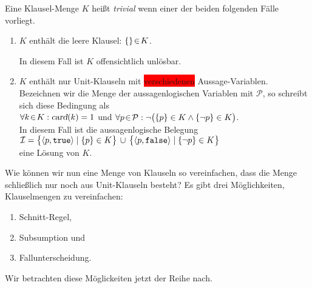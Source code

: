 \begin{Definition}
  Eine Klausel-Menge $K$ hei\ss{}t \emph{\color{blue}trivial} wenn einer der beiden folgenden F\"{a}lle
  vorliegt.
  \begin{enumerate}
  \item $K$ enth\"{a}lt die leere Klausel: \qquad $\{\} \!\in\! K$.

        In diesem Fall ist $K$ offensichtlich unl\"{o}sbar.
  \item $K$ enth\"{a}lt nur Unit-Klauseln mit \colorbox{red}{verschiedenen} Aussage-Variablen.
        Bezeichnen wir die Menge der aussagenlogischen Variablen mit $\mathcal{P}$,
        so schreibt sich diese Bedingung als 
        \\[0.3cm]
        \hspace*{1.3cm}
        $\forall k \!\in\! K: \textsl{card}(k) = 1$ \quad und \quad
        $\forall p \!\in\! \mathcal{P}: \neg\bigl( \{p\} \in K \wedge \{\neg p\} \in K\bigr)$.
        \\[0.3cm]
        In diesem Fall ist die aussagenlogische Belegung
        \\[0.2cm]
        \hspace*{1.3cm}
        $ \I = \bigl\{ \pair(p, \texttt{true}) \mid \{p\} \in K \bigr\} \,\cup\, \bigl\{
             \pair(p, \texttt{false}) \mid \{\neg p\} \in K \bigr\} 
        $
        \\[0.2cm]
        eine L\"{o}sung von $K$. \eox
  \end{enumerate}
\end{Definition}


Wie k\"{o}nnen wir nun eine Menge von Klauseln so vereinfachen, dass die Menge schlie\ss{}lich nur
noch aus Unit-Klauseln besteht?  Es gibt drei
M\"{o}glichkeiten, Klauselmengen zu vereinfachen:
\begin{enumerate}
\item Schnitt-Regel,
\item Subsumption und
\item Fallunterscheidung.
\end{enumerate}
Wir betrachten diese M\"{o}glickeiten jetzt der Reihe nach.


